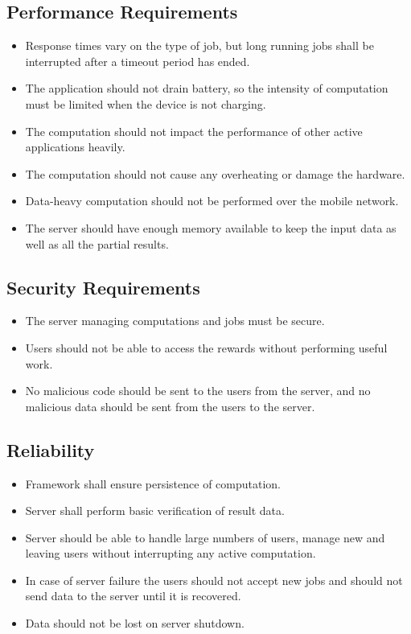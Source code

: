 \documentclass[a4paper,10pt]{article}
\begin{document}
\subsection{Performance Requirements}

\begin{itemize}
	\item Response times vary on the type of job, but long running jobs shall be interrupted after a timeout period has ended.
	\item The application should not drain battery, so the intensity of computation must be limited when the device is not charging.
	\item The computation should not impact the performance of other active applications heavily.
	\item The computation should not cause any overheating or damage the hardware.
	\item Data-heavy computation should not be performed over the mobile network.
	\item The server should have enough memory available to keep the input data as well as all the partial results.
\end{itemize} 

\subsection{Security Requirements}

\begin{itemize}
	\item The server managing computations and jobs must be secure.
	\item Users should not be able to access the rewards without performing useful work.
	\item No malicious code should be sent to the users from the server, and no malicious data should be sent from the users to the server.
\end{itemize} 

\subsection{Reliability}

\begin{itemize}
	\item Framework shall ensure persistence of computation.
	\item Server shall perform basic verification of result data.
	\item Server should be able to handle large numbers of users, manage new and leaving users without interrupting any active computation.
	\item In case of server failure the users should not accept new jobs and should not send data to the server until it is recovered.
	\item Data should not be lost on server shutdown.
\end{itemize} 
\end{document}

